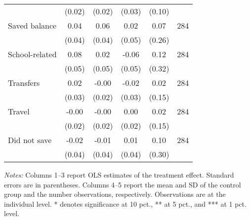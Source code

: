 \begin{table}[h]
{\begin{threeparttable}
\begin{tabular}{l*{5}{c}}
          &   (0.02)&   (0.02)&   (0.03)&   (0.10)&         \\
Saved balance&     0.04&     0.06&     0.02&     0.07&      284\\
          &   (0.04)&   (0.04)&   (0.05)&   (0.26)&         \\
School-related&     0.08&     0.02&    -0.06&     0.12&      284\\
          &   (0.05)&   (0.05)&   (0.05)&   (0.32)&         \\
Transfers &     0.02&    -0.00&    -0.02&     0.02&      284\\
          &   (0.03)&   (0.02)&   (0.03)&   (0.15)&         \\
Travel    &    -0.00&    -0.00&     0.00&     0.02&      284\\
          &   (0.02)&   (0.02)&   (0.02)&   (0.15)&         \\
Did not save&    -0.02&    -0.01&     0.01&     0.10&      284\\
          &   (0.04)&   (0.04)&   (0.04)&   (0.30)&         \\
\bottomrule \end{tabular} \begin{tablenotes}[flushleft] \footnotesize \item \emph{Notes:} Columns 1--3 report OLS estimates of the treatment effect. Standard errors are in parentheses. Columns 4--5 report the mean and SD of the control group and the number observations, respectively. Observations are at the individual level. * denotes significance at 10 pct., ** at 5 pct., and *** at 1 pct. level. \end{tablenotes} \end{threeparttable} } \end{table}

